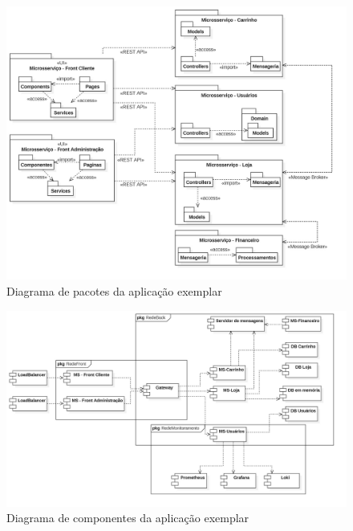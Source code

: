 \begin{figure}[htb]
	\caption{\label{figura-diagrama-de-pacotes}Diagrama de pacotes da aplicação exemplar}
	\begin{center}
	    \includegraphics[scale=0.27]{Diagramas/imagens/Pacotes.jpg}
	\end{center}
\end{figure}

\begin{figure}[htb]
	\caption{\label{figura-diagrama-de-componentes}Diagrama de componentes da aplicação exemplar}
	\begin{center}
	    \includegraphics[scale=0.27]{Diagramas/imagens/Componentes-Redes.jpg}
	\end{center}
\end{figure}

